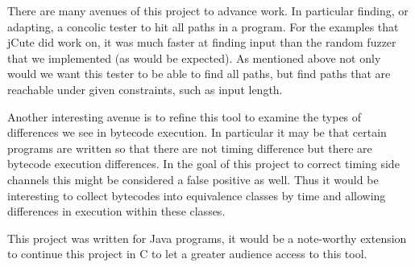 
There are many avenues of this project to advance work. In particular finding, or adapting, a concolic tester to hit all paths in a program. For the examples that jCute did work on, it was much faster at finding input than the random fuzzer that we implemented (as would be expected). As mentioned above not only would we want this tester to be able to find all paths, but find paths that are reachable under given constraints, such as input length.

Another interesting avenue is to refine this tool to examine the types of differences we see in bytecode execution. In particular it may be that certain programs are written so that there are not timing difference but there are bytecode execution differences. In the goal of this project to correct timing side channels this might be considered a false positive as well. Thus it would be interesting to collect bytecodes into equivalence classes by time and allowing differences in execution within these classes.

This project was written for Java programs, it would be a note-worthy extension to continue this project in C to let a greater audience access to this tool.
